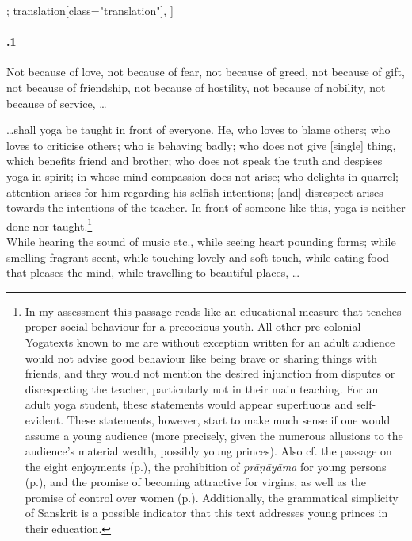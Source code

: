 \begin{alignment}[
  texts=edition[class="edition"];
  translation[class="translation"],
  ]
\begin{translation}
\begin{tlate}[58_1]
      \paragraph{.1 } Not because of love, not because of fear, not because of greed, not because of gift, not because of friendship, not because of hostility, not because of nobility, not because of service, \ldots\\
    \end{tlate}
    \begin{tlate}[p58_02]
\ldots shall yoga be taught in front of everyone. He, who loves to blame others; who loves to criticise others; who is behaving badly; who does not give [single] thing, which benefits friend and brother; who does not speak the truth and despises yoga in spirit; in whose mind compassion does not arise; who delights in quarrel; attention arises for him regarding his selfish intentions; [and] disrespect arises towards the intentions of the teacher. In front of someone like this, yoga is neither done nor taught.\footnote{In my assessment this passage reads like an educational measure that teaches proper social behaviour for a precocious youth. All other pre-colonial Yogatexts known to me are without exception written for an adult audience would not advise good behaviour like being brave or sharing things with friends, and they would not mention the desired injunction from disputes or disrespecting the teacher, particularly not in their main teaching. For an adult yoga student, these statements would appear superfluous and self-evident. These statements, however, start to make much sense if one would assume a young audience (more precisely, given the numerous allusions to the audience's material wealth, possibly young princes). Also cf. the passage on the eight enjoyments (p.\label{eightenjoyments}), the prohibition of \textit{prāṇāyāma} for young persons (p.\pageref{ashtanga}), and the promise of becoming attractive for virgins, as well as the promise of control over women (p.\pageref{women}). Additionally, the grammatical simplicity of Sanskrit is a possible indicator that this text addresses young princes in their education.} \\

While hearing the sound of music etc., while seeing heart pounding forms; while smelling fragrant scent, while touching lovely and soft touch, while eating food that pleases the mind, while travelling to beautiful places, \ldots
    \end{tlate}
  \end{translation}
\end{alignment}
